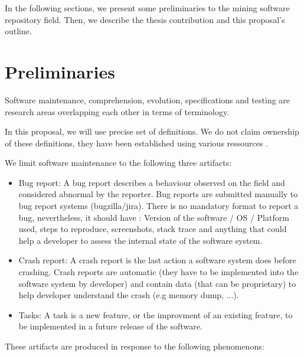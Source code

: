 In the following sections, we present some preliminaries to the mining software repository field. Then, we describe the thesis contribution and this proposal's outline.

\section{Preliminaries\label{sec:preliminaries}}

Software maintenance, comprehension, evolution, specifications and testing are research areas overlapping each other in terms of terminology.

In this proposal, we will use precise set of definitions.
We do not claim ownership of these definitions, they have been established using various ressources \cite{Avizienis2004,Pratt2001,Burnstein2006,Radatz1990,Whittaker2012}.

We limit software maintenance to the following three artifacts:

\begin{itemize}
	\item Bug report: A bug report describes a behaviour observed on the field and considered abnormal by the reporter. Bug reports are submitted manually to bug report systems (bugzilla/jira). There is no mandatory format to report a bug, nevertheless, it should have : Version of the software / OS / Platform used, steps to reproduce, screenshots, stack trace and anything that could help a developer to assess the internal state of the software system.
	\item Crash report: A crash report is the last action a software system does before crashing. Crash reports are automatic (they have to be implemented into the software system by developer) and contain data (that can be proprietary) to help developer understand the crash (e.g memory dump, ...).
	\item Tasks: A task is a new feature, or the improvment of an existing feature, to be implemented in a future release of the software.
\end{itemize}

These artifacts are produced in response to the following phenomenons:

